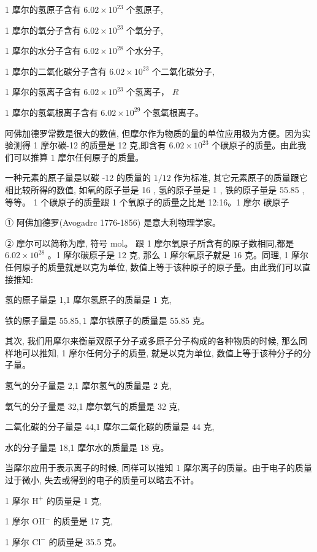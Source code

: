 \documentclass[10pt]{article}
\begin{document}
1 摩尔的氢原子含有 \({6.02} \times {10}^{23}\) 个氢原子,

1 摩尔的氧分子含有 \({6.02} \times {10}^{23}\) 个氧分子,

1 摩尔的水分子含有 \({6.02} \times {10}^{28}\) 个水分子,

1 摩尔的二氧化碳分子含有 \({6.02} \times {10}^{23}\) 个二氧化碳分子,

1 摩尔的氢离子含有 \({6.02} \times {10}^{23}\) 个氢离子， \(R\)

\(1\) 摩尔的氢氧根离子含有 \({6.02} \times {10}^{29}\) 个氢氧根离子。

阿佛加德罗常数是很大的数值, 但摩尔作为物质的量的单位应用极为方便。因为实验测得 1 摩尔碳-12 的质量是 12 克,即含有 \({6.02} \times {10}^{23}\) 个碳原子的质量。由此我们可以推算 \(1\) 摩尔任何原子的质量。

一种元素的原子量是以碳 -12 的质量的 \(1/{12}\) 作为标准, 其它元素原子的质量跟它相比较所得的数值, 如氧的原子量是 16 , 氢的原子量是 1 , 铁的原子量是 55.85 , 等等。 1 个碳原子的质量跟 1 个氧原子的质量之比是 12:16。1 摩尔 碳原子

① 阿佛加德罗(Avogadrc 1776-1856) 是意大利物理学家。

② 摩尔可以简称为摩, 符号 mol。 跟 1 摩尔氧原子所含有的原子数相同,都是 \({6.02} \times {10}^{28}\) 。1 摩尔碳原子是 12 克, 那么 1 摩尔氧原子就是 16 克。同理, 1 摩尔任何原子的质量就是以克为单位, 数值上等于该种原子的原子量。由此我们可以直接推知:

氢的原子量是 1,1 摩尔氢原子的质量是 1 克,

铁的原子量是 \({55.85},1\) 摩尔铁原子的质量是 55.85 克。

其次, 我们用摩尔来衡量双原子分子或多原子分子构成的各种物质的时候, 那么同样地可以推知, 1 摩尔任何分子的质量, 就是以克为单位, 数值上等于该种分子的分子量。

氢气的分子量是 2,1 摩尔氢气的质量是 2 克,

氧气的分子量是 32,1 摩尔氧气的质量是 32 克,

二氧化碳的分子量是 44,1 摩尔二氧化碳的质量是 44 克,

水的分子量是 18,1 摩尔水的质量是 18 克。

当摩尔应用于表示离子的时候, 同样可以推知 1 摩尔离子的质量。由于电子的质量过于微小, 失去或得到的电子的质量可以略去不计。

1 摩尔 \({\mathrm{H}}^{ + }\) 的质量是 1 克,

1 摩尔 \({\mathrm{{OH}}}^{ - }\) 的质量是 17 克,

1 摩尔 \({\mathrm{{Cl}}}^{ - }\) 的质量是 35.5 克。
\end{document}
